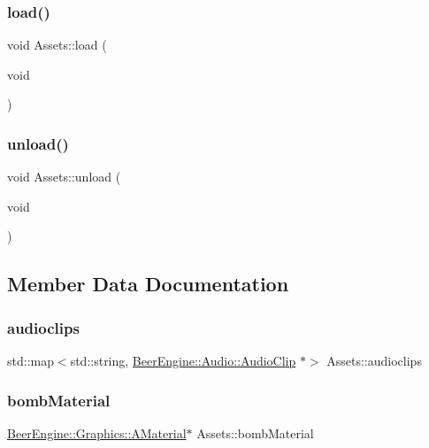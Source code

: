 \subsubsection{\texorpdfstring{load()}{load()}}
{\footnotesize\ttfamily void Assets\+::load (\begin{DoxyParamCaption}\item[{void}]{ }\end{DoxyParamCaption})}

\mbox{\label{class_assets_a7c382091adff219150cbd067d646fe16}} 
\subsubsection{\texorpdfstring{unload()}{unload()}}
{\footnotesize\ttfamily void Assets\+::unload (\begin{DoxyParamCaption}\item[{void}]{ }\end{DoxyParamCaption})}



\subsection{Member Data Documentation}
\mbox{\label{class_assets_a74f01d64e94c8e26e8187d189cd018dc}} 
\subsubsection{\texorpdfstring{audioclips}{audioclips}}
{\footnotesize\ttfamily std\+::map$<$std\+::string, \mbox{\hyperlink{class_beer_engine_1_1_audio_1_1_audio_clip}{Beer\+Engine\+::\+Audio\+::\+Audio\+Clip}} $\ast$$>$ Assets\+::audioclips}

\mbox{\label{class_assets_a3888adb2654159b9791da38233467632}} 
\subsubsection{\texorpdfstring{bomb\+Material}{bombMaterial}}
{\footnotesize\ttfamily \mbox{\hyperlink{class_beer_engine_1_1_graphics_1_1_a_material}{Beer\+Engine\+::\+Graphics\+::\+A\+Material}}$\ast$ Assets\+::bomb\+Material}

